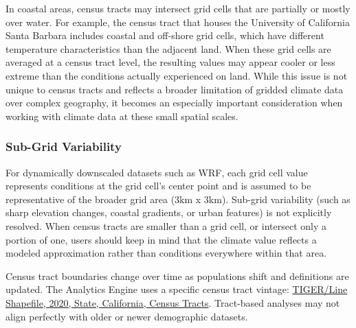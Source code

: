 \documentclass[
  letterpaper,
  DIV=11,
  numbers=noendperiod]{scrartcl}
\begin{document}
In coastal areas, census tracts may intersect grid cells that are
partially or mostly over water. For example, the census tract that
houses the University of California Santa Barbara includes coastal and
off-shore grid cells, which have different temperature characteristics
than the adjacent land. When these grid cells are averaged at a census
tract level, the resulting values may appear cooler or less extreme than
the conditions actually experienced on land. While this issue is not
unique to census tracts and reflects a broader limitation of gridded
climate data over complex geography, it becomes an especially important
consideration when working with climate data at these small spatial
scales.

\subsubsection{Sub-Grid Variability}\label{sub-grid-variability}

For dynamically downscaled datasets such as WRF, each grid cell value
represents conditions at the grid cell's center point and is assumed to
be representative of the broader grid area (3km x 3km). Sub-grid
variability (such as sharp elevation changes, coastal gradients, or
urban features) is not explicitly resolved. When census tracts are
smaller than a grid cell, or intersect only a portion of one, users
should keep in mind that the climate value reflects a modeled
approximation rather than conditions everywhere within that area.

\begin{tcolorbox}[enhanced jigsaw, arc=.35mm, bottomrule=.15mm, bottomtitle=1mm, breakable, colback=white, colbacktitle=quarto-callout-note-color!10!white, colframe=quarto-callout-note-color-frame, coltitle=black, left=2mm, leftrule=.75mm, opacityback=0, opacitybacktitle=0.6, rightrule=.15mm, title=\textcolor{quarto-callout-note-color}{\faInfo}\hspace{0.5em}{Note}, titlerule=0mm, toprule=.15mm, toptitle=1mm]

Census tract boundaries change over time as populations shift and
definitions are updated. The Analytics Engine uses a specific census
tract vintage:
\href{https://catalog.data.gov/dataset/tiger-line-shapefile-2020-state-california-census-tracts}{TIGER/Line
Shapefile, 2020, State, California, Census Tracts}. Tract-based analyses
may not align perfectly with older or newer demographic datasets.

\end{tcolorbox}
\end{document}
